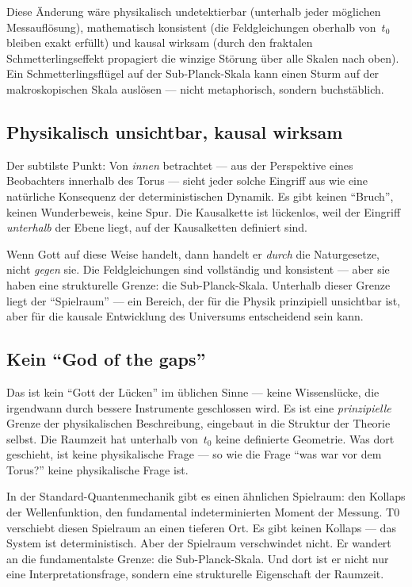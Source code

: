 Diese Änderung wäre physikalisch undetektierbar (unterhalb jeder möglichen Messauflösung), mathematisch konsistent (die Feldgleichungen oberhalb von~$t_0$ bleiben exakt erfüllt) und kausal wirksam (durch den fraktalen Schmetterlingseffekt propagiert die winzige Störung über alle Skalen nach oben). Ein Schmetterlingsflügel auf der Sub-Planck-Skala kann einen Sturm auf der makroskopischen Skala auslösen --- nicht metaphorisch, sondern buchstäblich.

\subsection{Physikalisch unsichtbar, kausal wirksam}

Der subtilste Punkt: Von \emph{innen} betrachtet --- aus der Perspektive eines Beobachters innerhalb des Torus --- sieht jeder solche Eingriff aus wie eine natürliche Konsequenz der deterministischen Dynamik. Es gibt keinen \enquote{Bruch}, keinen Wunderbeweis, keine Spur. Die Kausalkette ist lückenlos, weil der Eingriff \emph{unterhalb} der Ebene liegt, auf der Kausalketten definiert sind.

Wenn Gott auf diese Weise handelt, dann handelt er \emph{durch} die Naturgesetze, nicht \emph{gegen} sie. Die Feldgleichungen sind vollständig und konsistent --- aber sie haben eine strukturelle Grenze: die Sub-Planck-Skala. Unterhalb dieser Grenze liegt der \enquote{Spielraum} --- ein Bereich, der für die Physik prinzipiell unsichtbar ist, aber für die kausale Entwicklung des Universums entscheidend sein kann.

\subsection{Kein \enquote{God of the gaps}}

Das ist kein \enquote{Gott der Lücken} im üblichen Sinne --- keine Wissenslücke, die irgendwann durch bessere Instrumente geschlossen wird. Es ist eine \emph{prinzipielle} Grenze der physikalischen Beschreibung, eingebaut in die Struktur der Theorie selbst. Die Raumzeit hat unterhalb von~$t_0$ keine definierte Geometrie. Was dort geschieht, ist keine physikalische Frage --- so wie die Frage \enquote{was war vor dem Torus?} keine physikalische Frage ist.

In der Standard-Quantenmechanik gibt es einen ähnlichen Spielraum: den Kollaps der Wellenfunktion, den fundamental indeterminierten Moment der Messung. T0 verschiebt diesen Spielraum an einen tieferen Ort. Es gibt keinen Kollaps --- das System ist deterministisch. Aber der Spielraum verschwindet nicht. Er wandert an die fundamentalste Grenze: die Sub-Planck-Skala. Und dort ist er nicht nur eine Interpretationsfrage, sondern eine strukturelle Eigenschaft der Raumzeit.


